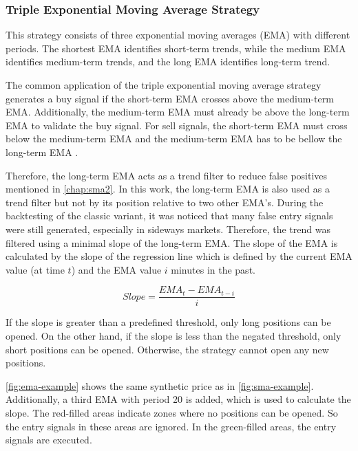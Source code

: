 \subsubsection{Triple Exponential Moving Average Strategy}

This strategy consists of three exponential moving averages (EMA) with different periods.
The shortest EMA identifies short-term trends, while the medium EMA identifies medium-term trends, and the long EMA identifies long-term trend.

The common application of the triple exponential moving average strategy generates a buy signal if the short-term EMA crosses above the medium-term EMA.
Additionally, the medium-term EMA must already be above the long-term EMA to validate the buy signal.
For sell signals, the short-term EMA must cross below the medium-term EMA and the medium-term EMA has to be bellow the long-term EMA \cite{ema3-basics}.

Therefore, the long-term EMA acts as a trend filter to reduce false positives mentioned in \autoref{chap:sma2}.
In this work, the long-term EMA is also used as a trend filter but not by its position relative to two other EMA's.
During the backtesting of the classic variant, it was noticed that many false entry signals were still generated, especially in sideways markets.
Therefore, the trend was filtered using a minimal slope of the long-term EMA.
The slope of the EMA is calculated by the slope of the regression line which is defined by the current EMA value (at time $t$) and the EMA value $i$ minutes in the past.

\[
    Slope = \frac{EMA_t - EMA_{t-i}}{i}
\]

\noindent
If the slope is greater than a predefined threshold, only long positions can be opened.
On the other hand, if the slope is less than the negated threshold, only short positions can be opened.
Otherwise, the strategy cannot open any new positions.

\autoref{fig:ema-example} shows the same synthetic price as in \autoref{fig:sma-example}.
Additionally, a third EMA with period 20 is added, which is used to calculate the slope.
The red-filled areas indicate zones where no positions can be opened.
So the entry signals in these areas are ignored.
In the green-filled areas, the entry signals are executed.

